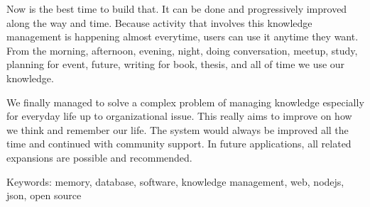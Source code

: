 Now is the best time to build that.
It can be done and progressively improved along the way and time.
Because activity that involves this knowledge management is happening almost everytime,
users can use it anytime they want.
From the morning, afternoon, evening, night, doing conversation, meetup, study, planning for event, future, writing for book, thesis, and all of time we use our knowledge.

We finally managed to solve a complex problem of managing knowledge especially for everyday life up to organizational issue.
This really aims to improve on how we think and remember our life.
The system would always be improved all the time and continued with community support.
In future applications, all related expansions are possible and recommended.

%
\vfill

Keywords: memory, database, software, knowledge management, web, nodejs, json, open source

\pagebreak



\endgroup

\vfill



